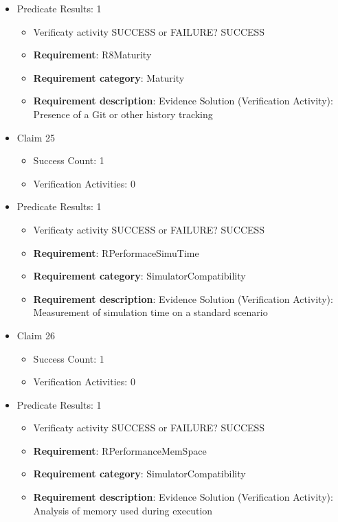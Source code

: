 \documentclass{article}
\begin{document}
\begin{itemize}
									    
				\item Predicate Results: 1
					\begin{itemize}				
					\item Verificaty activity SUCCESS or FAILURE? SUCCESS
					
					\item \textbf{Requirement}: R8Maturity 
					\item \textbf{Requirement category}: Maturity
					\item \textbf{Requirement description}: Evidence Solution (Verification Activity): Presence of a Git or other history tracking
					\end{itemize}

  				  \item Claim 25
				\begin{itemize}
			    	\item Success Count: 1 
			    	\item Verification Activities: 0
				\end{itemize}
				
									    
				\item Predicate Results: 1
					\begin{itemize}				
					\item Verificaty activity SUCCESS or FAILURE? SUCCESS
					
					\item \textbf{Requirement}: RPerformaceSimuTime 
					\item \textbf{Requirement category}: SimulatorCompatibility
					\item \textbf{Requirement description}: Evidence Solution (Verification Activity): Measurement of simulation time on a standard scenario
					\end{itemize}

  				  \item Claim 26
				\begin{itemize}
			    	\item Success Count: 1 
			    	\item Verification Activities: 0
				\end{itemize}
				
									    
				\item Predicate Results: 1
					\begin{itemize}				
					\item Verificaty activity SUCCESS or FAILURE? SUCCESS
					
					\item \textbf{Requirement}: RPerformanceMemSpace 
					\item \textbf{Requirement category}: SimulatorCompatibility
					\item \textbf{Requirement description}: Evidence Solution (Verification Activity): Analysis of memory used during execution
					\end{itemize}

			\end{itemize}

		
\end{document}
